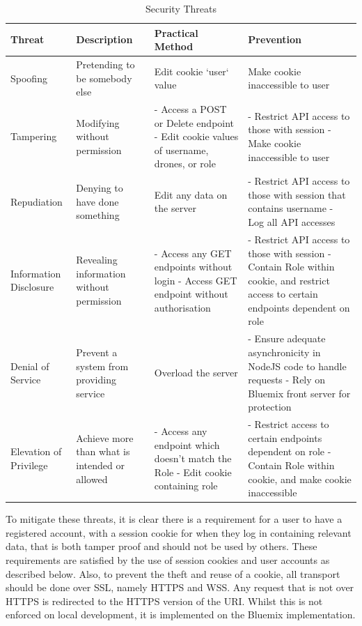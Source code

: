 \documentclass{article}
\begin{document}
\begin{table}[h]  
\caption{Security Threats\label{tab:SecurityThreats}}
\centering
\renewcommand{\arraystretch}{1.5}
\begin{tabularx}{\textwidth}{ | >{\centering}p{1.5cm} |  >{\centering}p{3cm} | X  | X |}
\hline
Threat & Description & Practical Method & Prevention \\ [0.5ex]
\hline
Spoofing & Pretending to be somebody else & Edit cookie `user` value & Make cookie inaccessible to user \\ \hline
Tampering & Modifying without permission & - Access a POST or Delete endpoint \newline - Edit cookie values of username, drones, or role & - Restrict API access to those with session \newline - Make cookie inaccessible to user \\  \hline
Repudiation & Denying to have done something & Edit any data on the server & - Restrict API access to those with session that contains username \newline - Log all API accesses \\ \hline
Information Disclosure & Revealing information without permission & - Access any GET endpoints without login \newline - Access GET endpoint without authorisation & - Restrict API access to those with session \newline - Contain Role within cookie, and restrict access to certain endpoints dependent on role \\ \hline
Denial of Service & Prevent a system from providing service & Overload the server & - Ensure adequate asynchronicity in NodeJS code to handle requests \newline - Rely on Bluemix front server for protection \\ \hline
Elevation of Privilege & Achieve more than what is intended or allowed & - Access any endpoint which doesn't match the Role \newline - Edit cookie containing role & - Restrict access to certain endpoints dependent on role \newline - Contain Role within cookie, and make cookie inaccessible \\ 
\hline
\end{tabularx}
\end{table}
To mitigate these threats, it is clear there is a requirement for a user to have a registered account, with a session cookie for when they log in containing relevant data, that is both tamper proof and should not be used by others. These requirements are satisfied by the use of session cookies and user accounts as described below. Also, to prevent the theft and reuse of a cookie, all transport should be done over SSL, namely HTTPS and WSS. Any request that is not over HTTPS is redirected to the HTTPS version of the URI. Whilst this is not enforced on local development, it is implemented on the Bluemix implementation.
\end{document}
